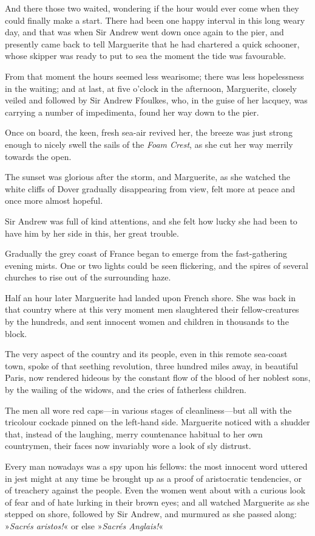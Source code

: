 And there those two waited, wondering if the hour would ever come when they could finally make a start. There had been one happy interval in this long weary day, and that was when Sir Andrew went down once again to the pier, and presently came back to tell Marguerite that he had chartered a quick schooner, whose skipper was ready to put to sea the moment the tide was favourable.

From that moment the hours seemed less wearisome; there was less hopelessness in the waiting; and at last, at five o'clock in the afternoon, Marguerite, closely veiled and followed by Sir Andrew Ffoulkes, who, in the guise of her lacquey, was carrying a number of impedimenta, found her way down to the pier.

Once on board, the keen, fresh sea-air revived her, the breeze was just strong enough to nicely swell the sails of the \textit{Foam Crest}, as she cut her way merrily towards the open.

The sunset was glorious after the storm, and Marguerite, as she watched the white cliffs of Dover gradually disappearing from view, felt more at peace and once more almost hopeful.

Sir Andrew was full of kind attentions, and she felt how lucky she had been to have him by her side in this, her great trouble.

Gradually the grey coast of France began to emerge from the fast-gathering evening mists. One or two lights could be seen flickering, and the spires of several churches to rise out of the surrounding haze.

Half an hour later Marguerite had landed upon French shore. She was back in that country where at this very moment men slaughtered their fellow-creatures by the hundreds, and sent innocent women and children in thousands to the block.

The very aspect of the country and its people, even in this remote sea-coast town, spoke of that seething revolution, three hundred miles away, in beautiful Paris, now rendered hideous by the constant flow of the blood of her noblest sons, by the wailing of the widows, and the cries of fatherless children.

The men all wore red caps—in various stages of  cleanliness—but all with the tricolour cockade pinned on the left-hand side. Marguerite noticed with a shudder that, instead of the laughing, merry countenance habitual to her own countrymen, their faces now invariably wore a look of sly distrust.

Every man nowadays was a spy upon his fellows: the most innocent word uttered in jest might at any time be brought up as a proof of aristocratic tendencies, or of treachery against the people. Even the women went about with a curious look of fear and of hate lurking in their brown eyes; and all watched Marguerite as she stepped on shore, followed by Sir Andrew, and murmured as she passed along: »\textit{Sacrés aristos!}« or else »\textit{Sacrés Anglais!}«

